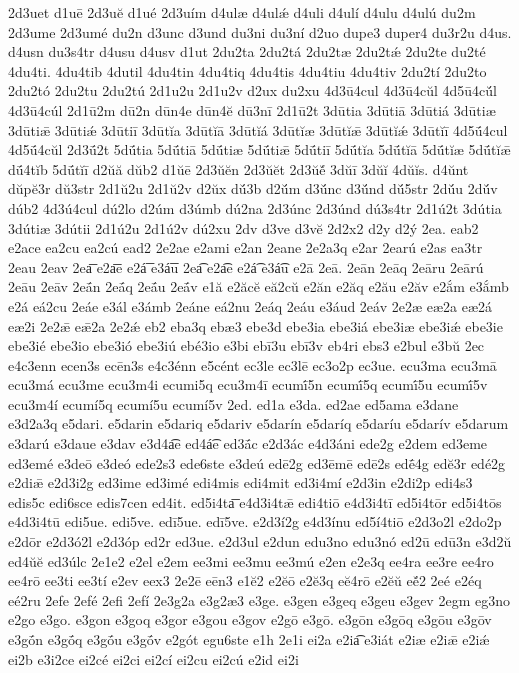 {2d3uet
d1uē
2d3uĕ
d1ué
2d3uím
d4ulæ
d4ulǽ
d4uli
d4ulí
d4ulu
d4ulú
du2m
2d3ume
2d3umé
du2n
d3unc
d3und
du3ni
du3ní
d2uo
dupe3
duper4
du3r2u
d4us.
d4usn
du3s4tr
d4usu
d4usv
d1ut
2du2ta
2du2tá
2du2tæ
2du2tǽ
2du2te
du2té
4du4ti.
4du4tib
4dutil
4du4tin
4du4tiq
4du4tis
4du4tiu
4du4tiv
2du2tí
2du2to
2du2tó
2du2tu
2du2tú
2d1u2u
2d1u2v
d2ux
du2xu
4d3ū4cul
4d3ū4cŭl
4d5ū4cŭ́l
4d3ū4cúl
2d1ū2m
dū2n
dūn4e
dūn4ĕ
dū3nī
2d1ū2t
3dūtia
3dūtiā
3dūtiá
3dūtiæ
3dūtiǣ
3dūtiǽ
3dūtiī
3dūtĭa
3dūtĭā
3dūtĭá
3dūtĭæ
3dūtĭǣ
3dūtĭǽ
3dūtĭī
4d5ū́4cul
4d5ū́4cŭl
2d3ū́2t
5dū́tia
5dū́tiā
5dū́tiæ
5dū́tiǣ
5dū́tiī
5dū́tĭa
5dū́tĭā
5dū́tĭæ
5dū́tĭǣ
dū́4tĭb
5dū́tĭī
d2ŭă
dŭb2
d1ŭē
2d3ŭĕn
2d3ŭĕt
2d3ŭĕ́
3dŭī
3dŭĭ
4dŭĭs.
d4ŭnt
dŭpĕ3r
dŭ3str
2d1ŭ2u
2d1ŭ2v
d2ŭx
dŭ́3b
d2ŭ́m
d3ŭ́nc
d3ŭ́nd
dŭ́5str
2dŭ́u
2dŭ́v
dúb2
4d3ú4cul
dú2lo
d2úm
d3úmb
dú2na
2d3únc
2d3únd
dú3s4tr
2d1ú2t
3dútia
3dútiæ
3dútii
2d1ú2u
2d1ú2v
dú2xu
2dv
d3ve
d3vĕ
2d2x2
d2y
d2ý
2ea.
eab2
e2ace
ea2cu
ea2cú
ead2
2e2ae
e2ami
e2an
2eane
2e2a3q
e2ar
2earú
e2as
ea3tr
2eau
2eav
2ea͞
e2a͞e
e2á͞
e3á͞u
2ea͡
e2a͡e
e2á͡
e3á͡u
e2ā
2eā.
2eān
2eāq
2eāru
2eārú
2eāu
2eāv
2eā́n
2eā́q
2eā́u
2eā́v
e1ă
e2ăcĕ
eă2cŭ
e2ăn
e2ăq
e2ău
e2ăv
e2ắm
e3ắmb
e2á
eá2cu
2eáe
e3ál
e3ámb
2eáne
eá2nu
2eáq
2eáu
e3áud
2eáv
2e2æ
eæ2a
eæ2á
eæ2i
2e2ǣ
eǣ2a
2e2ǽ
eb2
eba3q
ebæ3
ebe3d
ebe3ia
ebe3iá
ebe3iæ
ebe3iǽ
ebe3ie
ebe3ié
ebe3io
ebe3ió
ebe3iú
ebé3io
e3bi
ebī3u
ebī3v
eb4ri
ebs3
e2bul
e3bŭ
2ec
e4c3enn
ecen3s
ecēn3s
e4c3énn
e5cént
ec3le
ec3lē
ec3o2p
ec3ue.
ecu3ma
ecu3mā
ecu3má
ecu3me
ecu3m4i
ecumi5q
ecu3m4ī
ecumī́5n
ecumī́5q
ecumī́5u
ecumī́5v
ecu3m4í
ecumí5q
ecumí5u
ecumí5v
2ed.
ed1a
e3da.
ed2ae
ed5ama
e3dane
e3d2a3q
e5dari.
e5darin
e5dariq
e5dariv
e5darín
e5daríq
e5daríu
e5darív
e5darum
e3darú
e3daue
e3dav
e3d4a͡e
ed4á͡e
ed3ā́c
e2d3ác
e4d3áni
ede2g
e2dem
ed3eme
ed3emé
e3deō
e3deó
ede2s3
ede6ste
e3deú
edē2g
ed3ēmē
edē2s
edḗ4g
edĕ3r
edé2g
e2diǣ
e2d3i2g
ed3ime
ed3imé
edi4mis
edi4mit
ed3i4mí
e2d3in
e2di2p
edi4s3
edis5c
edi6sce
edis7cen
ed4it.
ed5i4ta͞
e4d3i4tǣ
edi4tiō
e4d3i4tī
ed5i4tōr
ed5i4tōs
e4d3i4tū
edi5ue.
edi5ve.
edī5ue.
edī5ve.
e2d3í2g
e4d3ínu
ed5í4tiō
e2d3o2l
e2do2p
e2dōr
e2d3ó2l
e2d3óp
ed2r
ed3ue.
e2d3ul
e2dun
edu3no
edu3nó
ed2ū
edū3n
e3d2ŭ
ed4ŭĕ
ed3úlc
2e1e2
e2el
e2em
ee3mi
ee3mu
ee3mú
e2en
e2e3q
ee4ra
ee3re
ee4ro
ee4rō
ee3ti
ee3tí
e2ev
eex3
2e2ē
eēn3
e1ĕ2
e2ĕō
e2ĕ3q
eĕ4rō
e2ĕŭ
eĕ́2
2eé
e2éq
eé2ru
2efe
2efé
2efi
2efí
2e3g2a
e3g2æ3
e3ge.
e3gen
e3geq
e3geu
e3gev
2egm
eg3no
e2go
e3go.
e3gon
e3goq
e3gor
e3gou
e3gov
e2gō
e3gō.
e3gōn
e3gōq
e3gōu
e3gōv
e3gṓn
e3gṓq
e3gṓu
e3gṓv
e2gót
egu6ste
e1h
2e1i
ei2a
e2ia͡
e3iát
e2iæ
e2iǣ
e2iǽ
ei2b
e3i2ce
ei2cé
ei2ci
ei2cí
ei2cu
ei2cú
e2id
ei2i
}
